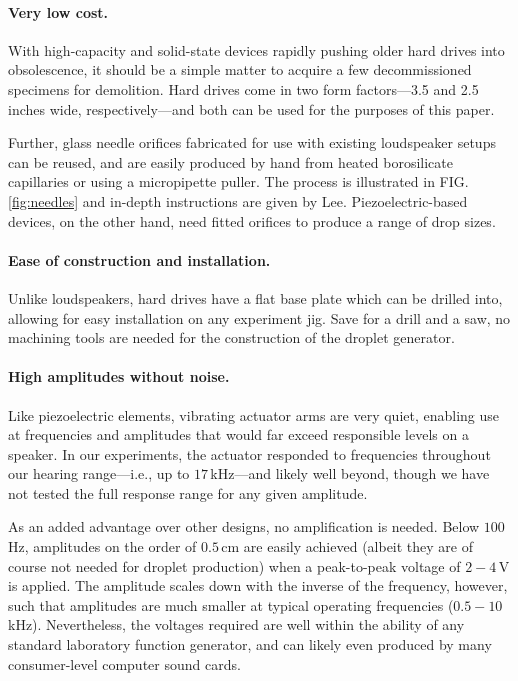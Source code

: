 \documentclass[11.5pt]{book}
\begin{document}
\paragraph*{Very low cost.} With high-capacity and solid-state devices rapidly pushing older hard drives
into obsolescence, it should be a simple matter to acquire a few decommissioned specimens for
demolition. Hard drives come in two form factors---3.5 and 2.5 inches wide,
respectively---and both can be used for the purposes of this paper. 

Further, glass needle orifices fabricated for use with existing loudspeaker setups can be
reused, and are easily produced by hand from heated borosilicate capillaries or
using a micropipette puller. The process is illustrated in FIG.
\ref{fig:needles} and in-depth instructions are given by Lee\cite{Lee02}.
Piezoelectric-based devices, on the other hand, need fitted orifices to produce a range of
drop sizes.

\paragraph*{Ease of construction and installation.} Unlike loudspeakers, hard
drives have a flat base plate which can be drilled into, allowing for easy
installation on any experiment jig. Save for a drill and a saw, no machining
tools are needed for the construction of the droplet generator.

\paragraph*{High amplitudes without noise.}
Like piezoelectric elements, vibrating actuator arms are very quiet, enabling
use at frequencies and amplitudes that would far exceed responsible levels on
a speaker.  In our experiments, the actuator responded to frequencies throughout
our hearing range---i.e., up to $17\,$kHz---and likely well beyond, though we
have not tested the full response range for any given amplitude.

As an added advantage over other designs, no amplification is needed. Below
$100\,$Hz, amplitudes on the order of $0.5\,$cm are easily achieved (albeit they
are of course not needed for droplet production) when a peak-to-peak voltage of
$2-4\,$V is applied. The amplitude scales down with the inverse of the frequency,
however, such that amplitudes are much smaller at typical operating frequencies
($0.5-10\,$kHz). Nevertheless, the voltages required are well within the ability
of any standard laboratory function generator, and can likely even produced by many
consumer-level computer sound cards.
\end{document}
